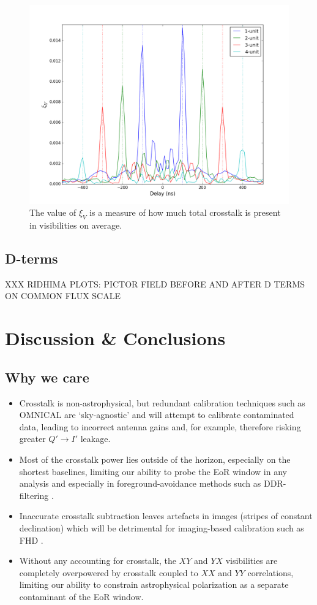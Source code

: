 \documentclass[10pt,a4paper,notitlepage]{article}
\begin{document}
\begin{figure}
\centering
\includegraphics[scale=0.5]{xi_V-zoom.png}
\caption{The value of $\xi_V$ is a measure of how much total crosstalk is present in visibilities on average.}
\label{fig:xi_V}
\end{figure}

\subsection{D-terms}

XXX RIDHIMA PLOTS: PICTOR FIELD BEFORE AND AFTER D TERMS ON COMMON FLUX SCALE\\

\section{Discussion \& Conclusions}
\label{sec:conc}

\subsection{Why we care}
\begin{itemize}
\item Crosstalk is non-astrophysical, but redundant calibration techniques such as OMNICAL \cite{Zheng} are `sky-agnostic' and will attempt to calibrate contaminated data, leading to incorrect antenna gains and, for example, therefore risking greater $Q' \rightarrow I'$ leakage.
\item Most of the crosstalk power lies outside of the horizon, especially on the shortest baselines, limiting our ability to probe the EoR window in any analysis and especially in foreground-avoidance methods such as DDR-filtering \cite{Parsons}.
\item Inaccurate crosstalk subtraction leaves artefacts in images (stripes of constant declination) which will be detrimental for imaging-based calibration such as FHD \cite{Sullivan}.
\item Without any accounting for crosstalk, the $XY$ and $YX$ visibilities are completely overpowered by crosstalk coupled to $XX$ and $YY$ correlations, limiting our ability to constrain astrophysical polarization as a separate contaminant of the EoR window.
\end{itemize}
\end{document}
